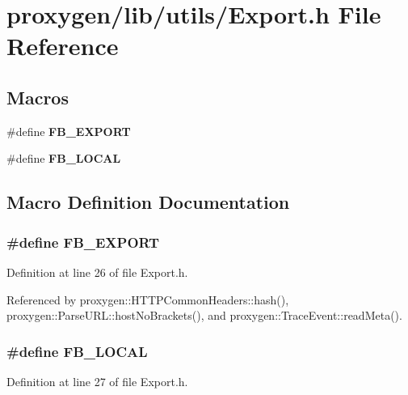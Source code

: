 \section{proxygen/lib/utils/\+Export.h File Reference}
\label{Export_8h}
\subsection*{Macros}
\begin{DoxyCompactItemize}
\item 
\#define {\bf F\+B\+\_\+\+E\+X\+P\+O\+RT}
\item 
\#define {\bf F\+B\+\_\+\+L\+O\+C\+AL}
\end{DoxyCompactItemize}


\subsection{Macro Definition Documentation}
\subsubsection[{F\+B\+\_\+\+E\+X\+P\+O\+RT}]{\setlength{\rightskip}{0pt plus 5cm}\#define F\+B\+\_\+\+E\+X\+P\+O\+RT}\label{Export_8h_aafb5455fe5b045371b5fe661fc12974c}


Definition at line 26 of file Export.\+h.



Referenced by proxygen\+::\+H\+T\+T\+P\+Common\+Headers\+::hash(), proxygen\+::\+Parse\+U\+R\+L\+::host\+No\+Brackets(), and proxygen\+::\+Trace\+Event\+::read\+Meta().

\subsubsection[{F\+B\+\_\+\+L\+O\+C\+AL}]{\setlength{\rightskip}{0pt plus 5cm}\#define F\+B\+\_\+\+L\+O\+C\+AL}\label{Export_8h_a34eb28d4d5634fd2e88e0d59f3def3bd}


Definition at line 27 of file Export.\+h.

